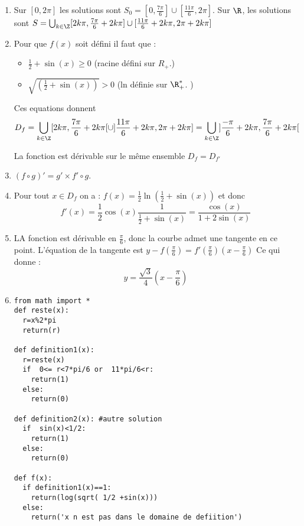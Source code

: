 \begin{correction}
\begin{enumerate}
\item Sur $[0,2\pi]$ les solutions sont $S_0=[0,\frac{7\pi}{6}]\cup [\frac{11\pi}{6},2\pi]$. Sur $\R$, les solutions sont $S=\bigcup_{k\in \Z} [2k\pi,\frac{7\pi}{6}+2k\pi]\cup [\frac{11\pi}{6}+2k\pi,2\pi+2k\pi]$
\item Pour que $f(x)$ soit défini il faut que : 

\begin{itemize}
\item  $\frac{1}{2}+\sin(x) \geq 0$ (racine défini sur $R_+$.)
\item  $\sqrt{(\frac{1}{2}+\sin(x) )} >0$  (ln définie sur $\R_+^*$. )
\end{itemize}
Ces equations donnent $$D_f = \bigcup_{k\in \Z} [2k\pi,\frac{7\pi}{6}+2k\pi[\cup ]\frac{11\pi}{6}+2k\pi,2\pi+2k\pi]=\bigcup_{k\in \Z} ]\frac{-\pi}{6}+2k\pi,\frac{7\pi}{6}+2k\pi[ $$

La fonction est dérivable sur le même ensemble $D_f=D_{f'}$

\item $(f\circ g)' = g' \times f'\circ g$. 
\item Pour tout $x\in D_{f}$ on a :
$f(x) = \frac{1}{2}\ln(\frac{1}{2}+\sin(x))$ et donc
$$f'(x) = \frac{1}{2} \cos(x) \frac{1}{\frac{1}{2}+\sin(x)}= \frac{\cos(x)}{1+2\sin(x)}$$
\item LA fonction est dérivable en $\frac{\pi}{6}$, donc la courbe admet une tangente en ce point.  L'équation de la tangente est $y-f(\frac{\pi}{6}) =f'(\frac{\pi}{6}) (x-\frac{\pi}{6}) $ Ce qui donne : 
$$ y =\frac{\sqrt{3}}{4}(x-\frac{\pi}{6})$$ 


\item
\begin{lstlisting}
from math import *
def reste(x):
  r=x%2*pi
  return(r)
  
def definition1(x):
  r=reste(x)
  if  0<= r<7*pi/6 or  11*pi/6<r:
    return(1)
  else:
    return(0)

def definition2(x): #autre solution
  if  sin(x)<1/2:
    return(1)
  else:
    return(0)
    
def f(x):
  if definition1(x)==1:
    return(log(sqrt( 1/2 +sin(x)))
  else:
    return('x n est pas dans le domaine de defiition')
   
\end{lstlisting}
\end{enumerate}
\end{correction}